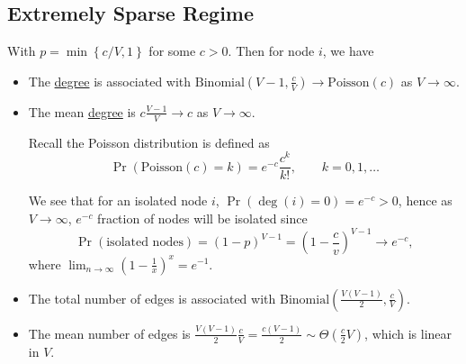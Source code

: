\subsection{Extremely Sparse Regime}\label{subsec:extremely-sparse-regime}
With \(p = \min\left\{c / V, 1\right\}\) for some \(c>0\). Then for node \(i\), we have
\begin{itemize}
	\item The \hyperref[def:degree]{degree} is associated with \(\mathrm{Binomial}(V - 1, \frac{c}{V}) \to \mathrm{Poisson}(c) \) as \(V\to \infty \).
	\item The mean \hyperref[def:degree]{degree} is \(c \frac{V-1}{V}\to c\) as \(V\to \infty.\)
	      \begin{note}
		      Recall the Poisson distribution is defined as
		      \[
			      \Pr( \mathrm{Poisson}(c)=k ) = e^{-c} \frac{c^k}{k!}, \qquad k = 0, 1, \ldots
		      \]
	      \end{note}
	      We see that for an isolated node \(i\), \(\Pr( \deg(i) =0) = e^{-c} > 0\), hence
	      as \(V\to \infty \), \(e^{-c}\) fraction of nodes will be isolated since
	      \[
		      \Pr( \text{isolated nodes}) = (1 - p)^{V - 1} = \left(1 - \frac{c}{v}\right)^{V-1} \to e^{-c},
	      \]
	      where \(\lim_{n \to \infty} \left(1 - \frac{1}{x}\right)^x = e^{-1}\).
	\item The total number of edges is associated with \(\mathrm{Binomial}\left(\frac{V(V-1)}{2}, \frac{c}{V}\right)\).
	\item The mean number of edges is \(\frac{V(V - 1)}{2}\frac{c}{V} = \frac{c(V - 1)}{2}\sim \Theta(\frac{c}{2}V)\), which is linear in \(V\).
\end{itemize}

